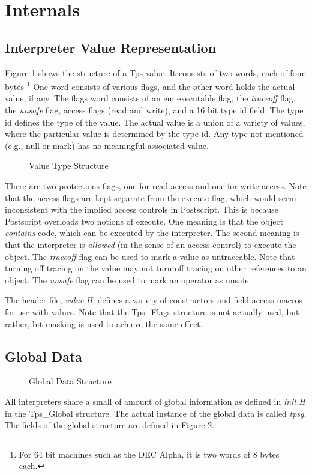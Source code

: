 \section{Internals}

\subsection{Interpreter Value Representation}
Figure \ref{valuestruct}
shows the structure of a Tps value.
It consists of two words, each of four bytes%
\footnote{For 64 bit machines such as the DEC Alpha, it is two
words of 8 bytes each.}
One word consists of various flags,
and the other word holds the actual value, if any.
The flags word consists of an
{em executable} flag,
the {\em traceoff} flag,
the {\em unsafe} flag,
access flags (read and write),
and a 16 bit type id field.
The type id defines the type of the value.
The actual value is a union of a variety of values, where the particular
value is determined by the type id.  Any type not mentioned (e.g., null
or mark) has no meaningful associated value.
\begin{figure}[t]\centering

\caption{Value Type Structure}
\label{valuestruct}
\horizontalline
\end{figure}

There are two protections flags, one for read-access and one for write-access.
Note that the access flags are kept separate from the execute flag,
which would seem inconsistent with the implied access controls
in Postscript.  This is because Postscript overloads two
notions of execute.  One meaning is that the object
{\em contains} code, which can be executed by the interpreter.
The second meaning is that the interpreter is {\em allowed}
(in the sense of an access control) to execute the object.
The {\em traceoff} flag 
can be used to mark a value as untraceable.  Note that turning off
tracing on the value may not turn off tracing on other references
to an object.
The {\em unsafe} flag 
can be used to mark an operator as unsafe.

The header file, {\em value.H}, defines a variety of constructors
and field access macros for use with values.  Note that the
Tps\_Flags structure is not actually used, but rather, bit masking
is used to achieve the same effect.

\subsection{Global Data}
\begin{figure}[b]\centering
\horizontalline

\caption{Global Data Structure}
\label{vglobal}
\end{figure}
All interpreters share a small of amount of global
information as defined in {\em init.H}
in the Tps\_Global structure.
The actual instance of the global data is called {\em tpsg}.
The fields of the global structure are defined in Figure \ref{vglobal}.

